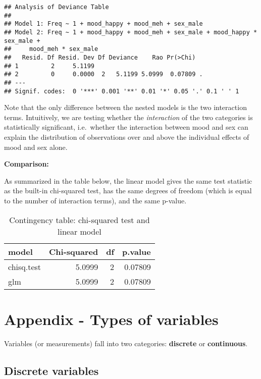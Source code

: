 \documentclass[
  12pt,
]{krantz}
\begin{document}
\begin{verbatim}
## Analysis of Deviance Table
## 
## Model 1: Freq ~ 1 + mood_happy + mood_meh + sex_male
## Model 2: Freq ~ 1 + mood_happy + mood_meh + sex_male + mood_happy * sex_male + 
##     mood_meh * sex_male
##   Resid. Df Resid. Dev Df Deviance    Rao Pr(>Chi)  
## 1         2     5.1199                              
## 2         0     0.0000  2   5.1199 5.0999  0.07809 .
## ---
## Signif. codes:  0 '***' 0.001 '**' 0.01 '*' 0.05 '.' 0.1 ' ' 1
\end{verbatim}

Note that the only difference between the nested models is the two interaction terms. Intuitively, we are testing whether the \emph{interaction} of the two categories is statistically significant, i.e.~whether the interaction between mood and sex can explain the distribution of observations over and above the individual effects of mood and sex alone.

\textbf{Comparison:}

As summarized in the table below, the linear model gives the same test statistic as the built-in chi-squared test, has the same degrees of freedom (which is equal to the number of interaction terms), and the same p-value.

\begin{table}

\caption{\label{tab:unnamed-chunk-67}Contingency table: chi-squared test and linear model}
\centering
\begin{tabular}[t]{lrrr}
\toprule
model & Chi-squared & df & p.value\\
\midrule
chisq.test & 5.0999 & 2 & 0.07809\\
glm & 5.0999 & 2 & 0.07809\\
\bottomrule
\end{tabular}
\end{table}

\hypertarget{appendixtypes}{%
\chapter{Appendix - Types of variables}\label{appendixtypes}}

Variables (or measurements) fall into two categories: \textbf{discrete} or \textbf{continuous}.

\hypertarget{discrete-variables}{%
\section{Discrete variables}\label{discrete-variables}}
\end{document}
